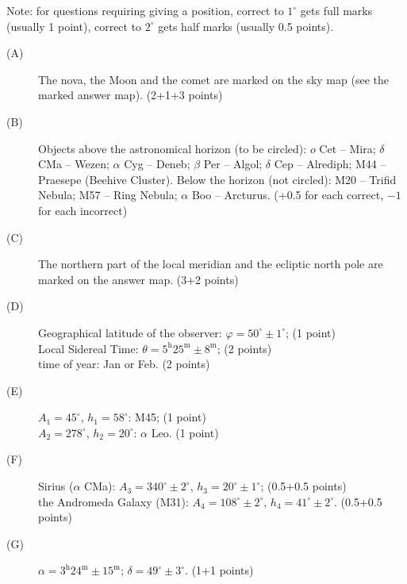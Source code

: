 Note: for questions requiring giving a position, correct to $1^\circ$ gets
full marks (usually 1 point), correct to $2^\circ$ gets half marks (usually
0.5 points).

\begin{description}
\item[(A)] The nova, the Moon and the comet are marked on the sky map (see
  the marked answer map). \hfill(2+1+3 points)
\item[(B)] Objects above the astronomical horizon (to be circled):
  $o$ Cet -- Mira; $\delta$ CMa -- Wezen; $\alpha$ Cyg -- Deneb;
  $\beta$ Per -- Algol; $\delta$ Cep -- Alrediph; M44 -- Praesepe (Beehive
  Cluster). Below the horizon (not circled): M20 -- Trifid Nebula;
  M57 -- Ring Nebula; $\alpha$ Boo -- Arcturus.
  \hfill(+0.5 for each correct, $-1$ for each incorrect)
\item[(C)] The northern part of the local meridian and the ecliptic north
  pole are marked on the answer map. \hfill(3+2 points)
\item[(D)] Geographical latitude of the observer:
  $\varphi = 50^\circ \pm 1^\circ$; \hfill(1 point)\\
  Local Sidereal Time:
  $\theta = 5^{\mathrm{h}}25^{\mathrm{m}} \pm 8^{\mathrm{m}}$;
  \hfill(2 points)\\
  time of year: Jan or Feb. \hfill(2 points)
\item[(E)] $A_1 = 45^\circ$, $h_1 = 58^\circ$: M45; \hfill(1 point)\\
  $A_2 = 278^\circ$, $h_2 = 20^\circ$: $\alpha$ Leo. \hfill(1 point)
\item[(F)] Sirius ($\alpha$ CMa):
  $A_3 = 340^\circ \pm 2^\circ$, $h_3 = 20^\circ \pm 1^\circ$;
  \hfill(0.5+0.5 points)\\
  the Andromeda Galaxy (M31):
  $A_4 = 108^\circ \pm 2^\circ$, $h_4 = 41^\circ \pm 2^\circ$.
  \hfill(0.5+0.5 points)
\item[(G)] $\alpha = 3^{\mathrm{h}}24^{\mathrm{m}} \pm 15^{\mathrm{m}}$;
  $\delta = 49^\circ \pm 3^\circ$. \hfill(1+1 points)
\end{description}
